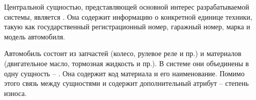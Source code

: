 \documentclass[../nirs.tex]{subfiles}
\begin{document}
\pagebreak

Центральной сущностью, представляющей основной интерес разрабатываемой системы,
является . Она содержит информацию о конкретной единице
техники, такую как государственный регистрационный номер, гаражный номер, марка
и модель автомобиля.

Автомобиль состоит из запчастей (колесо, рулевое реле и пр.) и материалов
(двигательное масло, тормозная жидкость и пр.). В системе они объединены в одну
сущность -- . Она содержит код материала и его наименование.
Помимо этого связь между сущностями  и
 содержит дополнительный атрибут -- степень износа.
\end{document}
